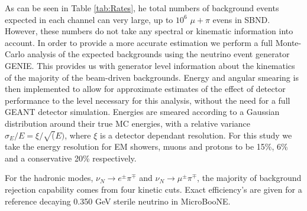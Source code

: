 \documentclass[11pt, a4paper]{article}
\begin{document}
As can be seen in Table \ref{tab:Rates}, he total numbers of background events expected in each channel can very large, up to $10^6$ $\mu+\pi$ evens in SBND. However, these numbers do not take any spectral or kinematic information into account. In order to provide a more accurate estimation we perform a full Monte-Carlo analysis of the expected backgrounds using the neutrino event generator GENIE. This provides us with generator level information about the kinematics of the majority of the beam-driven backgrounds. Energy and angular smearing is then implemented to allow for approximate estimates of the effect of detector performance to the level necessary for this analysis, without the need for a full GEANT detector simulation. Energies are smeared according to a Gaussian distribution around their true MC energies, with a relative variance $\sigma_E/E = \xi/ \sqrt(E) $, where $\xi$ is a detector dependant resolution. For this study we take the energy resolution for EM showers, muons and protons to be 15\%, 6\% and a conservative 20\% respectively.

For the hadronic modes, $\nu_N \rightarrow e^\pm \pi^\mp$ and $\nu_N \rightarrow \mu^\pm \pi^\mp$, the majority of background rejection capability comes from four kinetic cuts. Exact efficiency's are given for a reference decaying 0.350 GeV sterile neutrino in MicroBooNE.
\end{document}
